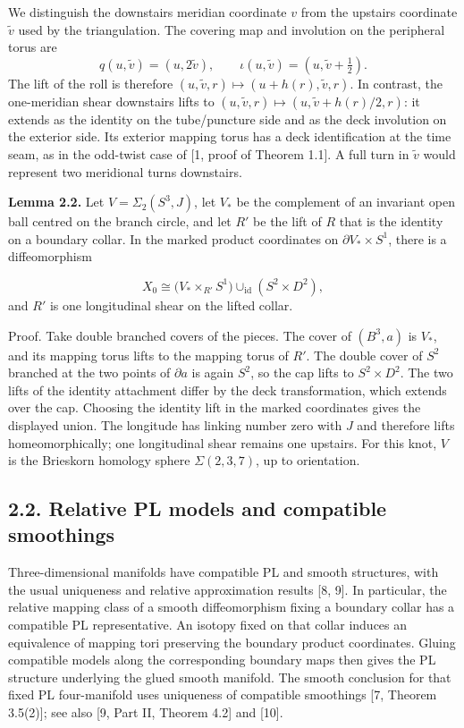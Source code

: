 \documentclass[11pt,letterpaper]{article}
\begin{document}
We distinguish the downstairs meridian coordinate $v$ from the upstairs coordinate $\widetilde v$ used by the triangulation. The covering map and involution on the peripheral torus are
\[
q(u,\widetilde v)=(u,2\widetilde v),
\qquad
\iota(u,\widetilde v)=(u,\widetilde v+\tfrac12).
\]
The lift of the roll is therefore $(u,\widetilde v,r)\mapsto(u+h(r),\widetilde v,r)$. In contrast, the one-meridian shear downstairs lifts to $(u,\widetilde v,r)\mapsto(u,\widetilde v+h(r)/2,r)$: it extends as the identity on the tube/puncture side and as the deck involution on the exterior side. Its exterior mapping torus has a deck identification at the time seam, as in the odd-twist case of [1, proof of Theorem 1.1]. A full turn in $\widetilde v$ would represent two meridional turns downstairs.

\medskip\noindent\textbf{Lemma 2.2.} Let $V=\Sigma_2(S^3,J)$, let $V_*$ be the complement of an invariant open ball centred on the branch circle, and let $R'$ be the lift of $R$ that is the identity on a boundary collar. In the marked product coordinates on $\partial V_*\times S^1$, there is a diffeomorphism

\[
X_0\cong\bigl(V_*\times_{R'}S^1\bigr)\cup_{\mathrm{id}}(S^2\times D^2),
\]
and $R'$ is one longitudinal shear on the lifted collar.

Proof. Take double branched covers of the pieces. The cover of $(B^3,a)$ is $V_*$, and its mapping torus lifts to the mapping torus of $R'$. The double cover of $S^2$ branched at the two points of $\partial a$ is again $S^2$, so the cap lifts to $S^2\times D^2$. The two lifts of the identity attachment differ by the deck transformation, which extends over the cap. Choosing the identity lift in the marked coordinates gives the displayed union. The longitude has linking number zero with $J$ and therefore lifts homeomorphically; one longitudinal shear remains one upstairs. For this knot, $V$ is the Brieskorn homology sphere $\Sigma(2,3,7)$, up to orientation.

\subsection*{2.2. Relative PL models and compatible smoothings}
Three-dimensional manifolds have compatible PL and smooth structures, with the usual uniqueness and relative approximation results [8, 9]. In particular, the relative mapping class of a smooth diffeomorphism fixing a boundary collar has a compatible PL representative. An isotopy fixed on that collar induces an equivalence of mapping tori preserving the boundary product coordinates. Gluing compatible models along the corresponding boundary maps then gives the PL structure underlying the glued smooth manifold. The smooth conclusion for that fixed PL four-manifold uses uniqueness of compatible smoothings [7, Theorem 3.5(2)]; see also [9, Part II, Theorem 4.2] and [10].
\end{document}
